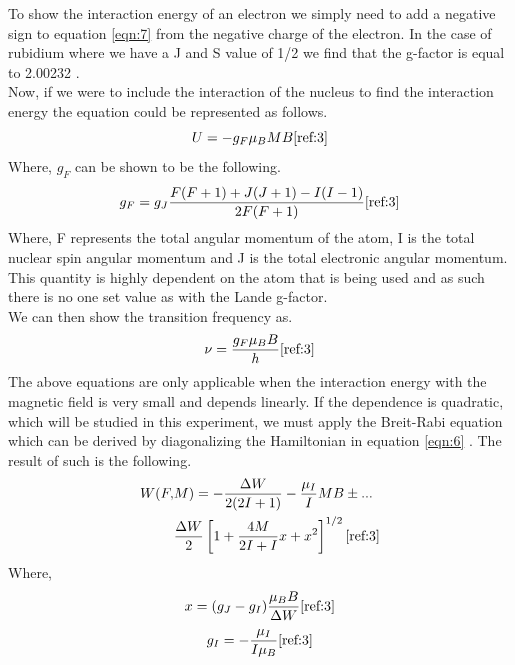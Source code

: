 \documentclass[twocolumn]{article}
\begin{document}
To show the interaction energy of an electron we simply need to add a negative 
sign to equation \ref{eqn:7} from the negative charge of the electron. In the 
case of rubidium where we have a J and S value of 1/2 we find that the g-factor 
is equal to 2.00232 \cite{ref:3}.
\\
Now, if we were to include the interaction of the nucleus to find the 
interaction energy the equation could be represented as follows.
\begin{equation}
U = -g_F\mu_B M B
\label{eqn:9}
\cite{ref:3}
\end{equation}
Where, $g_F$ can be shown to be the following.
\begin{equation}
g_F = g_J\frac{F(F+1)+J(J+1)-I(I-1)}{2F(F+1)}
\label{eqn:10}
\cite{ref:3}
\end{equation}
Where, F represents the total angular momentum of the atom, I is the total 
nuclear spin angular momentum and J is the total electronic angular momentum. 
This quantity is highly dependent on the atom that is being used and as such 
there is no one set value as with the Lande g-factor.
\\
We can then show the transition frequency as.
\begin{equation}
\nu = \frac{g_F\mu_B B}{h}
\label{eqn:11}
\cite{ref:3}
\end{equation}
The above equations are only applicable when the interaction energy with the 
magnetic field is very small and depends linearly. If the dependence is 
quadratic, which will be studied in this experiment, we must apply the 
Breit-Rabi equation which can be derived by diagonalizing the Hamiltonian in 
equation \ref{eqn:6} \cite{ref:3}. The result of such is the following.
\begin{equation}
\begin{aligned}
W(F,&M) = -\frac{\Delta W}{2(2I+1)}-\frac{\mu_I}{I}MB\pm ...
\\
          &\frac{\Delta W}{2}\left[1+\frac{4M}{2I+I}x+x^2\right]^{1/2}
\label{eqn:12}
\cite{ref:3}
\end{aligned}
\end{equation}
Where,
\begin{equation}
x = (g_J - g_I)\frac{\mu_B B}{\Delta W}
\label{eqn:13}
\cite{ref:3}
\end{equation}
\begin{equation}
g_I = -\frac{\mu_I}{I\mu_B}
\label{eqn:14}
\cite{ref:3}
\end{equation}
\end{document}
